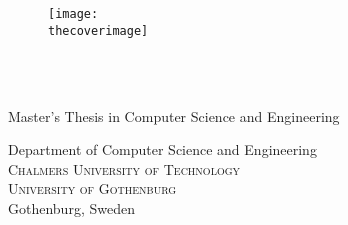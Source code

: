 
\newcommand{\oneLineTitle}{\thetitle}
\newcommand{\multiLineTitle}[1]{\thetitle}

\begin{titlepage}

\addtolength{\voffset}{2cm}

\ifdefined\thecoverimage
\begin{figure}[H]
\centering
\vspace{1cm}
\texttt{[image: \\thecoverimage]}
\end{figure}
\else
\vspace{1cm}
\fi

\setlength{\parindent}{0cm}
\setlength{\parskip}{0cm}

\mbox{}
\vfill
\renewcommand{\familydefault}{\sfdefault} \normalfont %

\textbf{\Huge \multiLineTitle{0.2cm}} \\[0.5cm]

\ifdefined\thesubtitle
{\Large \thesubtitle}\\[0.5cm]
\fi

Master's Thesis in Computer Science and Engineering

\vspace{1em}

{\Large \theauthor}

\vspace{2.9cm}

Department of Computer Science and Engineering \\
\textsc{Chalmers University of Technology} \\
\textsc{University of Gothenburg} \\
Gothenburg, Sweden \the\year

\renewcommand{\familydefault}{\rmdefault} \normalfont %
\end{titlepage}


\newpage
\restoregeometry
\thispagestyle{empty}
\mbox{}


